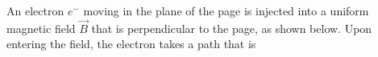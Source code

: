 \documentclass[12pt]{../../oss-apphys-exam}
\begin{document}
\begin{questions}
%
%  
%
  
  \question An electron $e^-$ moving in the plane of the page is injected into a
  uniform magnetic field $\vec B$ that is perpendicular to the page, as shown
  below. Upon entering the field, the electron takes a path that is


\end{questions}
\end{document}
